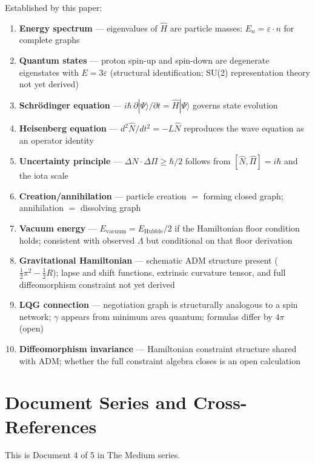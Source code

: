 \documentclass[11pt,letterpaper]{article}
\begin{document}
Established by this paper:
\begin{enumerate}
\item \textbf{Energy spectrum} --- eigenvalues of \(\hat{H}\) are particle masses: \(E_n = \varepsilon \cdot n\) for complete graphs
\item \textbf{Quantum states} --- proton spin-up and spin-down are degenerate eigenstates with \(E = 3\varepsilon\) (structural identification; SU(2) representation theory not yet derived)
\item \textbf{Schrödinger equation} --- \(i\hbar\,\partial|\Psi\rangle/\partial t = \hat{H}|\Psi\rangle\) governs state evolution
\item \textbf{Heisenberg equation} --- \(d^2\hat{N}/dt^2 = -L\hat{N}\) reproduces the wave equation as an operator identity
\item \textbf{Uncertainty principle} --- \(\Delta N \cdot \Delta\Pi \geq \hbar/2\) follows from \([\hat{N},\hat{\Pi}] = i\hbar\) and the iota scale
\item \textbf{Creation/annihilation} --- particle creation \(=\) forming closed graph; annihilation \(=\) dissolving graph
\item \textbf{Vacuum energy} --- \(E_\text{vacuum} = E_\text{Hubble}/2\) if the Hamiltonian floor condition holds; consistent with observed \(\Lambda\) but conditional on that floor derivation
\item \textbf{Gravitational Hamiltonian} --- schematic ADM structure present (\(\tfrac{1}{2}\pi^2 - \tfrac{1}{2}R\)); lapse and shift functions, extrinsic curvature tensor, and full diffeomorphism constraint not yet derived
\item \textbf{LQG connection} --- negotiation graph is structurally analogous to a spin network; \(\gamma\) appears from minimum area quantum; formulas differ by \(4\pi\) (open)
\item \textbf{Diffeomorphism invariance} --- Hamiltonian constraint structure shared with ADM; whether the full constraint algebra closes is an open calculation
\end{enumerate}

\section{Document Series and Cross-References}
\label{sec:org5e1461d}

This is Document 4 of 5 in The Medium series.
\end{document}
